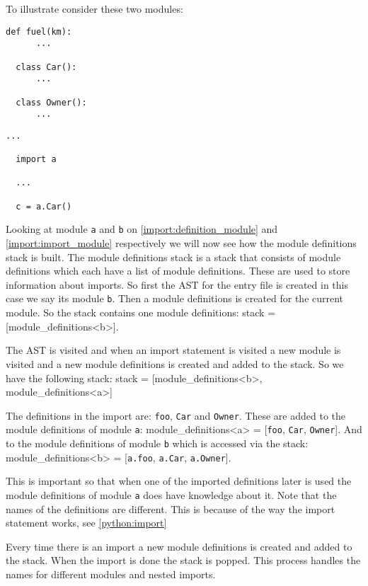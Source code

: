 To illustrate consider these two modules:

\begin{lstlisting}[style=python, caption={A module that defines a function and two classes called \texttt{a}}, label={import:definition_module}]
  def fuel(km):
      ...

  class Car():
      ...

  class Owner():
      ...
\end{lstlisting}
\begin{lstlisting}[style=python, caption={A module called \texttt{b} importing the above module \texttt{a}}, label={import:import_module}]
  ...
  
  import a
  
  ...

  c = a.Car()
\end{lstlisting}

Looking at module \texttt{a} and \texttt{b} on \cref{import:definition_module} and \cref{import:import_module} respectively we will now see how the module definitions stack is built.
The module definitions stack is a stack that consists of module definitions which each have a list of module definitions.
These are used to store information about imports.
So first the AST for the entry file is created in this case we say its module \texttt{b}.
Then a module definitions is created for the current module.
So the stack contains one module definitions: stack = [module\_definitions<b>].

The AST is visited and when an import statement is visited a new module is visited and a new module definitions is created and added to the stack.
So we have the following stack: stack = [module\_definitions<b>, module\_definitions<a>]

The definitions in the import are: \texttt{foo}, \texttt{Car} and \texttt{Owner}.
These are added to the module definitions of module \texttt{a}: module\_definitions<a> = [\texttt{foo}, \texttt{Car}, \texttt{Owner}].
And to the  module definitions of module \texttt{b} which is accessed via the stack:  module\_definitions<b> = [\texttt{a.foo}, \texttt{a.Car}, \texttt{a.Owner}].

This is important so that when one of the imported definitions later is used the module definitions of module \texttt{a} does have knowledge about it.
Note that the names of the definitions are different.
This is because of the way the import statement works, see \cref{python:import}

Every time there is an import a new module definitions is created and added to the stack.
When the import is done the stack is popped.
This process handles the names for different modules and nested imports.
